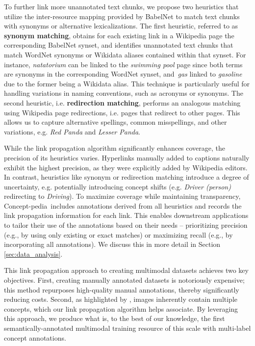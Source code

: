 \documentclass[11pt]{article}
\newcommand{\resource}{Concept-pedia}
\begin{document}
To further link more unannotated text chunks, we propose two heuristics that utilize the inter-resource mapping provided by BabelNet to match text chunks with synonyms or alternative lexicalizations. 
The first heuristic, referred to as \textbf{synonym matching}, obtains for each existing link in a Wikipedia page the corresponding BabelNet synset, and identifies unannotated text chunks that match WordNet synonyms or Wikidata aliases contained within that synset. 
For instance, \textit{natatorium} can be linked to the \textit{swimming pool} page since both terms are synonyms in the corresponding WordNet synset, and~\textit{gas} linked to \textit{gasoline} due to the former being a Wikidata alias. 
This technique is particularly useful for handling variations in naming conventions, such as acronyms or synonyms. 
The second heuristic, i.e. \textbf{redirection matching}, performs an analogous matching using Wikipedia page redirections, i.e. pages that redirect to other pages. 
This allows us to capture alternative spellings, common misspellings, and other variations, e.g. \textit{Red Panda} and \textit{Lesser Panda}. 

While the link propagation algorithm significantly enhances coverage, the precision of its heuristics varies. 
Hyperlinks manually added to captions naturally exhibit the highest precision, as they were explicitly added by Wikipedia editors. 
In contrast, heuristics like synonym or redirection matching introduce a degree of uncertainty, e.g. potentially introducing concept shifts (e.g. \textit{Driver (person)} redirecting to \textit{Driving}).
To maximize coverage while maintaining transparency, \resource~includes annotations derived from all heuristics and records the link propagation information for each link. 
This enables downstream applications to tailor their use of the annotations based on their needs -- prioritizing precision (e.g., by using only existing or exact matches) or maximizing recall (e.g., by incorporating all annotations). We discuss this in more detail in Section \ref{sec:data_analysis}.

This link propagation approach to creating multimodal datasets achieves two key objectives. First, creating manually annotated datasets is notoriously expensive; this method repurposes high-quality manual annotations, thereby significantly reducing costs. 
Second, as highlighted by \citet{beyer2020we}, images inherently contain multiple concepts, which our link propagation algorithm helps associate. 
By leveraging this approach, we produce what is, to the best of our knowledge, the first semantically-annotated multimodal training resource of this scale with multi-label concept annotations.
\end{document}
